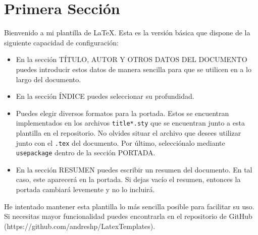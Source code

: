 \documentclass{article}
\begin{document}
\maketitle



\newpage
\tableofcontents
\newpage


\section{Primera Sección}

	Bienvenido a mi plantilla de \LaTeX. Esta es la versión básica que dispone de la siguiente capacidad de configuración:

	\begin{itemize}
		\item En la sección TÍTULO, AUTOR Y OTROS DATOS DEL DOCUMENTO puedes introducir estos datos de manera sencilla para que se utilicen en a lo largo del documento.
		\item En la sección ÍNDICE puedes seleccionar su profundidad.
		\item Puedes elegir diversos formatos para la portada. Estos se encuentran implementados en los archivos \texttt{title*.sty} que se encuentran junto a esta plantilla en el repositorio. No olvides situar el archivo que desees utilizar junto con el \texttt{.tex} del documento. Por último, selecciónalo mediante \texttt{usepackage} dentro de la sección PORTADA.
		\item En la sección RESUMEN puedes escribir un resumen del documento. En tal caso, este aparecerá en la portada. Si dejas vacío el resumen, entonces la portada cambiará levemente y no lo incluirá.
	\end{itemize}

	He intentado mantener esta plantilla lo más sencilla posible para facilitar su uso. Si necesitas mayor funcionalidad puedes encontrarla en el repositorio de GitHub (https://github.com/andreshp/LatexTemplates).
\end{document}

